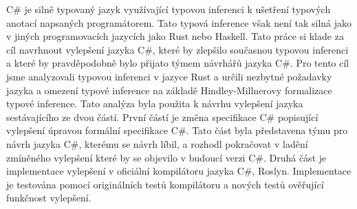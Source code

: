 \documentclass[12pt]{report}
\begin{document}

C\# je silně typovaný jazyk využívající typovou inferenci k ušetření typových anotací napsaných programátorem.
Tato typová inference však není tak silná jako v jiných programovacích jazycích jako Rust nebo Haskell.
Tato práce si klade za cíl navrhnout vylepšení jazyka C\#, které by zlepšilo současnou typovou inferenci a které by pravděpodobně bylo přijato týmem návrhářů jazyka C\#.
Pro tento cíl jsme analyzovali typovou inferenci v jazyce Rust a určili nezbytné požadavky jazyka a omezení typové inference na základě Hindley-Millnerovy formalizace typové inference. 
Tato analýza byla použita k návrhu vylepšení jazyka sestávajícího ze dvou částí.
První částí je změna specifikace C\# popisující vylepšení úpravou formální specifikace C\#.
Tato část byla představena týmu pro návrh jazyka C\#, kterému se návrh líbil, a rozhodl pokračovat v ladění zmíněného vylepšení které by se objevilo v budoucí verzi C\#.
Druhá část je implementace vylepšení v oficiální kompilátoru jazyka C\#, Roslyn. 
Implementace je testována pomocí originálních testů kompilátoru a nových testů ověřující funkčnost vylepšení.
\end{document}
